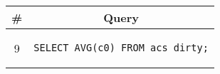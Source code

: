 \begin{tabular}{cl}
\toprule
\# & \multicolumn{1}{c}{Query} \\
\midrule
9 & 
\begin{minipage}{6in}
\begin{lstlisting}[breaklines]
SELECT AVG(c0) FROM acs_dirty;
\end{lstlisting}
\end{minipage}{queryno} \label[query]{q9} \\
\bottomrule
\end{tabular}
